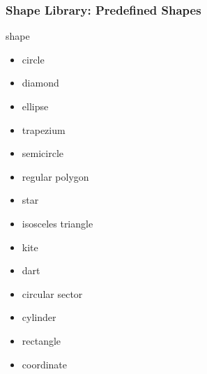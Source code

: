 \documentclass[ aspectratio=169,  12pt,blue,xcolor=pdftex,dvipsnames,table,handout,notes]{beamer}
\begin{document}
		\begin{frame}[t]
		\frametitle{Shape Library: Predefined Shapes}

			\begin{block}{shape}
			\begin{itemize}
			\item[] 	circle
			\item[] 	diamond
			\item[] 	ellipse
			\item[] 	trapezium
			\item[] 	semicircle
			\item[] 	regular polygon
			\item[] 	star
			\item[] 	isosceles triangle
			\item[] 	kite
			\item[] 	dart
			\item[] 	circular sector
			\item[] 	cylinder
			\item[] 	rectangle
			\item[] 	coordinate
			\end{itemize}
			\end{block}


\end{frame}
\end{document}
